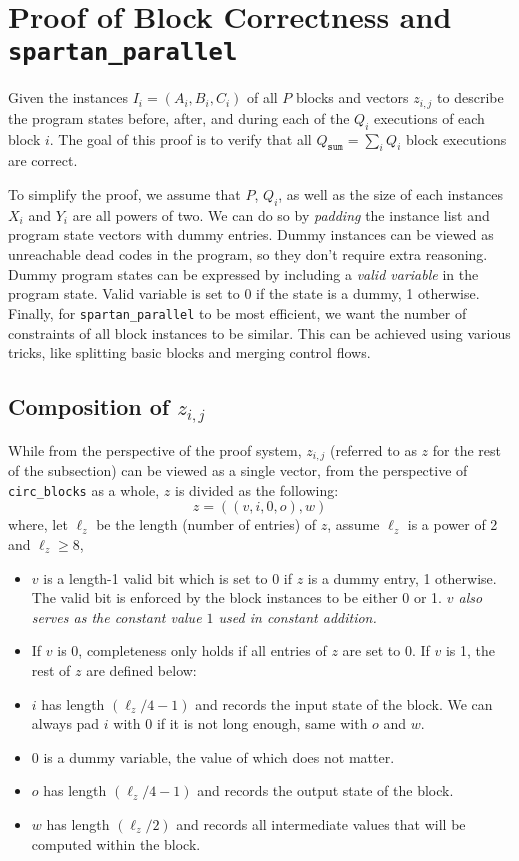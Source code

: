 \documentclass{article}
\newcommand{\code}{\texttt}
\newcommand{\Qsum}{Q_{\mathtt{sum}}}
\begin{document}

\section{Proof of Block Correctness and \code{spartan\_parallel}}\label{sec:block_correctness}

Given the instances $I_i = (A_i, B_i, C_i)$ of all $P$ blocks and vectors $z_{i, j}$ to describe the program states before, after, and during each of the $Q_i$ executions of each block $i$. The goal of this proof is to verify that all $\Qsum = \sum_i Q_i$ block executions are correct.

To simplify the proof, we assume that $P$, $Q_i$, as well as the size of each instances $X_i$ and $Y_i$ are all powers of two. We can do so by \emph{padding} the instance list and program state vectors with dummy entries. Dummy instances can be viewed as unreachable dead codes in the program, so they don't require extra reasoning. Dummy program states can be expressed by including a \emph{valid variable} in the program state. Valid variable is set to 0 if the state is a dummy, 1 otherwise. Finally, for \code{spartan\_parallel} to be most efficient, we want the number of constraints of all block instances to be similar. This can be achieved using various tricks, like splitting basic blocks and merging control flows.

\subsection{Composition of $z_{i, j}$}\label{io_composition}
While from the perspective of the proof system, $z_{i, j}$ (referred to as $z$ for the rest of the subsection) can be viewed as a single vector, from the perspective of \code{circ\_blocks} as a whole, $z$ is divided as the following:
$$z = ((v, i, 0, o), w)$$
where, let $\ell_z$ be the length (number of entries) of $z$, assume $\ell_z$ is a power of 2 and $\ell_z \geq 8$,
\begin{itemize}
    \item $v$ is a length-1 valid bit which is set to 0 if $z$ is a dummy entry, 1 otherwise. The valid bit is enforced by the block instances to be either 0 or 1. \emph{$v$ also serves as the constant value $1$ used in constant addition.}
    \item If $v$ is 0, completeness only holds if all entries of $z$ are set to 0. If $v$ is 1, the rest of $z$ are defined below:
    \item $i$ has length $(\ell_z / 4 - 1)$ and records the input state of the block. We can always pad $i$ with 0 if it is not long enough, same with $o$ and $w$.
    \item $0$ is a dummy variable, the value of which does not matter.
    \item $o$ has length $(\ell_z / 4 - 1)$ and records the output state of the block.
    \item $w$ has length $(\ell_z / 2)$ and records all intermediate values that will be computed within the block.
\end{itemize}
\end{document}
